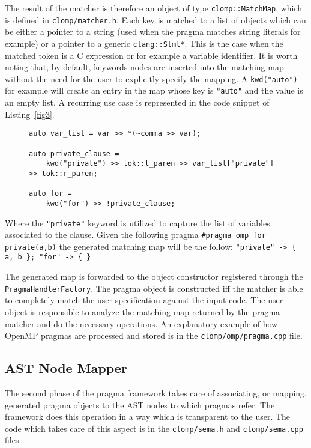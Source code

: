 \documentclass[10pt]{report}
\begin{document}
The result of the matcher is therefore an object of type
{\tt clomp::MatchMap}, which is defined in
{\tt clomp/matcher.h}. Each key is matched to a list of objects which
can be either a pointer to a string (used when the pragma matches string
literals for example) or a pointer to a generic {\tt clang::Stmt*}. This is the
case when the matched token is a C expression or for example a variable
identifier. It is worth noting that, by default, keywords nodes are inserted into
the matching map without the need for the user to explicitly specify the
mapping. A {\tt kwd("auto")} for example will create an entry in the map
whose key is {\tt "auto"} and the value is an empty list. A recurring use case
is represented in the code snippet of Listing~\ref{fig3}.

\begin{figure}[ht]
\begin{lstlisting}[label=fig3,caption=Example of pragma definition with CLOMP]
auto var_list = var >> *(~comma >> var);

auto private_clause = 
	kwd("private") >> tok::l_paren >> var_list["private"] >> tok::r_paren;

auto for = 
	kwd("for") >> !private_clause;
\end{lstlisting}
\end{figure}

Where the {\tt "private"} keyword is utilized to capture the list of variables
associated to the clause. Given the following pragma {\tt \#pragma omp for
private(a,b)} the generated matching map will be the follow: {\tt "private" -> \{
a, b \}; "for" -> \{ \} }

The generated map is forwarded to the object constructor registered through the
{\tt PragmaHandlerFactory}. The pragma object is constructed iff the matcher is
able to completely match the user specification against the input code. The user
object is responsible to analyze the matching map returned by the pragma matcher
and do the necessary operations. An explanatory example of how OpenMP pragmas
are processed and stored is in the {\tt clomp/omp/pragma.cpp}
file. 

\subsection{AST Node Mapper}

The second phase of the pragma framework takes care of associating, or mapping,
generated pragma objects to the AST nodes to which pragmas refer. The framework
does this operation in a way which is transparent to the user. The code which
takes care of this aspect is in the {\tt clomp/sema.h} and
{\tt clomp/sema.cpp} files. 
\end{document}
